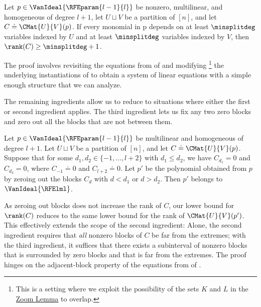 \begin{lemma}
  \label{lem.application.roabp.core}
  Let \(p\in\VanIdeal{\RFEparam{l-1}{l}}\) be nonzero, multilinear, and
  homogeneous of degree \(l+1\),
  let \(U\sqcup V\) be a partition of \([n]\),
  and let \(C \doteq \CMat{U}{V}(p)\).
  If every monomial in p depends on at least $\minsplitdeg$ variables indexed
  by $U$ and at least $\minsplitdeg$ variables indexed by $V$,
  then \(\rank(C) \ge \minsplitdeg+1\).
\end{lemma}

The proof involves revisiting the equations from  of  and modifying%
\footnote{This is a setting where we exploit the possibility of the sets $K$ and $L$ in the \hyperref[lem.multi-zsub-deriv]{Zoom Lemma} to overlap.}
the underlying instantiations of  to obtain a system of linear equations with a simple enough structure that we can analyze.

The remaining ingredients allow us to reduce to situations where either the
first or second ingredient applies.
The third ingredient lets us fix any two zero blocks
and zero out all the blocks that are not between them.

\begin{proposition}\label{prop:ROABP:zero}
  Let $p\in\VanIdeal{\RFEparam{l-1}{l}}$ be multilinear
  and homogeneous of degree $l+1$.
  Let $U\sqcup V$ be a partition of $[n]$,
  and let $C \doteq \CMat{U}{V}(p)$.
  Suppose that for some $d_1,d_2 \in \{-1,\dots,l+2\}$ with $d_1 \le d_2$,
  we have $C_{d_1} = 0$ and $C_{d_2} = 0$,
  where \(C_{-1} \doteq 0\) and \(C_{l+2} \doteq 0\).
  Let $p'$ be the polynomial obtained from $p$ by zeroing out the blocks
  $C_d$ with $d < d_1$ or $d > d_2$.
  Then $p'$ belongs to $\VanIdeal{\RFElml}$.
\end{proposition}

As zeroing out blocks does not increase the rank of \(C\),
our lower bound for \(\rank(C)\) reduces to the same lower bound for the rank
of \(\CMat{U}{V}(p')\).
This effectively extends the scope of the second ingredient:
Alone, the second ingredient requires that \emph{all} nonzero blocks of \(C\)
be far from the extremes;
with the third ingredient,
it suffices that there exists a subinterval of nonzero blocks that is surrounded by zero blocks and that is far from the extremes.
The proof hinges on the adjacent-block property of the equations from  of .

